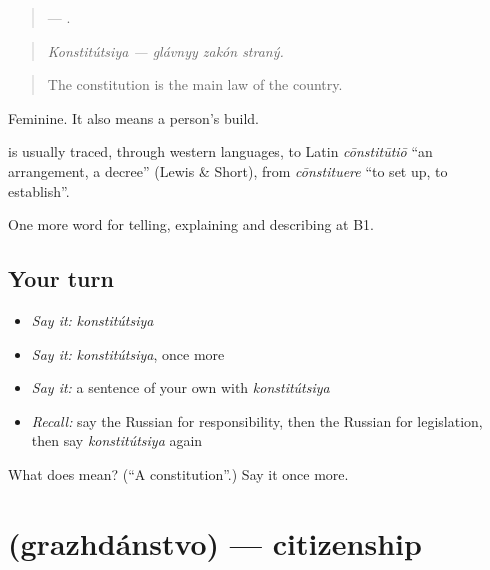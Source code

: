 \begin{quote}
 —   .
\end{quote}

\begin{quote}
\emph{Konstitútsiya — glávnyy zakón straný.}
\end{quote}

\begin{quote}
The constitution is the main law of the country.
\end{quote}

Feminine. It also means a person’s build.

\begin{cousinweb}
\textbf{} is usually traced, through western languages, to Latin \emph{cōnstitūtiō} \textquotedblleft{}an arrangement, a decree\textquotedblright{} (Lewis \& Short), from \emph{cōnstituere} \textquotedblleft{}to set up, to establish\textquotedblright{}.
\end{cousinweb}

\begin{grammarlens}[title={What you've built}]
One more word for telling, explaining and describing at B1.
\end{grammarlens}

\subsection*{Your turn}
\begin{itemize}
\raggedright
  \item \emph{Say it:} \emph{konstitútsiya}
  \item \emph{Say it:} \emph{konstitútsiya}, once more
  \item \emph{Say it:} a sentence of your own with \emph{konstitútsiya}
  \item \emph{Recall:} say the Russian for responsibility, then the Russian for legislation, then say \emph{konstitútsiya} again
\end{itemize}

\begin{tcolorbox}[breakable,colback=teal!4,colframe=teal!35!black,title={Before you move on}]
What does  mean? (\textquotedblleft{}A constitution\textquotedblright{}.) Say it once more.
\end{tcolorbox}
\section[\texorpdfstring{\ru{гражданство} (grazhdánstvo)}{гражданство (grazhdánstvo)}]{ (grazhdánstvo) — citizenship}

